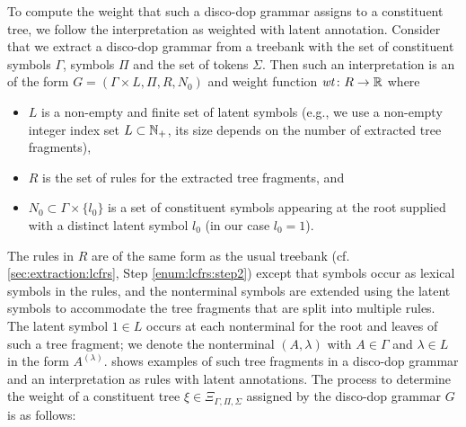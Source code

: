 \documentclass[../../document.tex]{subfiles}
\begin{document}
    To compute the weight that such a disco-dop grammar assigns to a constituent tree, we follow the interpretation as weighted  with latent annotation.
    Consider that we extract a disco-dop grammar from a treebank with the set of constituent symbols \(\varGamma\),  symbols \(\varPi\) and the set of tokens \(\varSigma\).
    Then such an interpretation is an  of the form \(G = (\varGamma \times L, \varPi, R, N_0)\) and weight function \(\mathit{wt}\colon R \to \mathbb{R}\)  where
    \begin{itemize}
        \item  \(L\) is a non-empty and finite set of latent symbols (e.g., we use a non-empty integer index set \(L \subset \mathbb{N}_+\), its size depends on the number of extracted tree fragments),
        \item \(R\) is the set of rules for the extracted tree fragments, and
        \item \(N_0 \subset \varGamma \times \{l_0\}\) is a set of constituent symbols appearing at the root supplied with a distinct latent symbol \(l_0\) (in our case \(l_0 = 1\)).
    \end{itemize}
    The rules in \(R\) are of the same form as the usual treebank  (cf.\@ \cref{sec:extraction:lcfrs}, Step \ref{enum:lcfrs:step2}) except that  symbols occur as lexical symbols in the rules, and the nonterminal symbols are extended using the latent symbols to accommodate the tree fragments that are split into multiple rules.
    The latent symbol \(1 \in L\) occurs at each nonterminal for the root and leaves of such a tree fragment; we denote the nonterminal \((A, \lambda)\) with \(A\in \varGamma\) and \(\lambda \in L\) in the form \(A^{(\lambda)}\).
     shows examples of such tree fragments in a disco-dop grammar and an interpretation as  rules with latent annotations.
    The process to determine the weight of a constituent tree \(\xi \in \Xi_{\varGamma, \varPi, \varSigma}\) assigned by the disco-dop grammar \(G\) is as follows:
\end{document}
